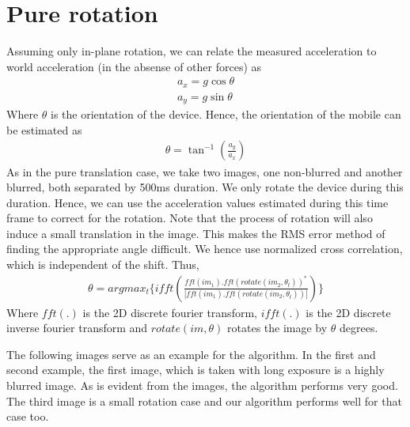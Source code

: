 \documentclass[BTech]{iitmdiss}
\begin{document}
\section{Pure rotation}
\label{image_registration:pure_rotation}
Assuming only in-plane rotation, we can relate the measured acceleration
to world acceleration (in the absense of other forces) as
\begin{align*}
a_x=g\cos\theta\\
a_y=g\sin\theta
\end{align*}
Where $\theta$ is the orientation of the device. Hence, the orientation
of the mobile can be estimated as
\begin{align*}
\theta=\tan^{-1}(\frac{a_y}{a_x})
\end{align*}
As in the pure translation case, we take two images, one non-blurred and
another blurred, both separated by 500ms duration. We only rotate the 
device during this duration. Hence, we can use the acceleration values
estimated during this time frame to correct for the rotation. Note that
the process of rotation will also induce a small translation in the 
image. This makes the RMS error method of finding the appropriate
angle difficult. We hence use normalized cross correlation, which is 
independent of the shift. Thus,
\begin{align*}
\theta=argmax_t\big\{ifft(\frac{fft(im_1).fft(rotate(im_2,\theta_t))^*}
{|fft(im_1).fft(rotate(im_2,\theta_t))|})\}
\end{align*}
Where $fft(.)$ is the 2D discrete fourier transform, $ifft(.)$ is the 2D 
discrete inverse fourier transform and $rotate(im, \theta)$ rotates the
 image by $\theta$ degrees.

The following images serve as an example for the algorithm. In the first
and second example, the first image, which is taken with long exposure
is a highly blurred image. As is evident from the images, the algorithm
performs very good. The third image is a small rotation case and our
algorithm performs well for that case too.
\end{document}
